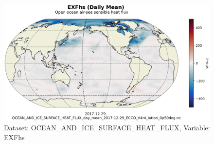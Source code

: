 \begin{figure}[H]
\centering
\includegraphics[scale=0.55]{../images/plots/latlon_plots/Ocean_and_Sea-Ice_Surface_Heat_Fluxes/EXFhs.png}
\caption{Dataset: OCEAN\_AND\_ICE\_SURFACE\_HEAT\_FLUX, Variable: EXFhs}
\label{tab:table-OCEAN_AND_ICE_SURFACE_HEAT_FLUX_EXFhs-Plot}
\end{figure}
\pagebreak
